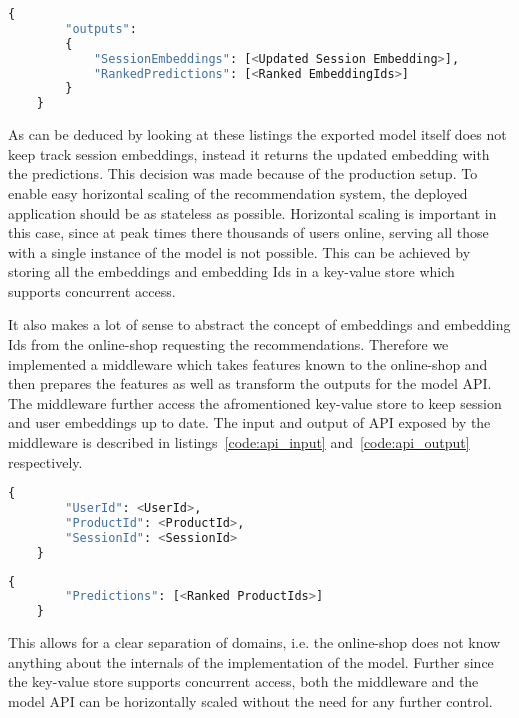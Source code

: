 \begin{minipage}{\linewidth}
    \begin{lstlisting}[language=Python,frame=single,caption=TF Serve API Output,label=code:tf_serve_output]
    {
        "outputs": 
        {
            "SessionEmbeddings": [<Updated Session Embedding>],
            "RankedPredictions": [<Ranked EmbeddingIds>]
        }
    }
    \end{lstlisting}
\end{minipage}

As can be deduced by looking at these listings the exported model itself does not keep track session embeddings, instead it returns the updated embedding with the predictions.
This decision was made because of the production setup.
To enable easy horizontal scaling of the recommendation system, the deployed application should be as stateless as possible.
Horizontal scaling is important in this case, since at peak times there thousands of users online, serving all those with a single instance of the model is not possible.
This can be achieved by storing all the embeddings and embedding Ids in a key-value store which supports concurrent access.
\par
It also makes a lot of sense to abstract the concept of embeddings and embedding Ids from the online-shop requesting the recommendations.
Therefore we implemented a middleware which takes features known to the online-shop and then prepares the features as well as transform the outputs for the model API.
The middleware further access the afromentioned key-value store to keep session and user embeddings up to date.
The input and output of API exposed by the middleware is described in listings~\ref{code:api_input} and~\ref{code:api_output} respectively.

\begin{minipage}{\linewidth}
    \begin{lstlisting}[language=Python,frame=single,caption=Middleware API Input,label=code:api_input]
    {
        "UserId": <UserId>,
        "ProductId": <ProductId>,
        "SessionId": <SessionId>
    }
    \end{lstlisting}
\end{minipage}

\begin{minipage}{\linewidth}
    \begin{lstlisting}[language=Python,frame=single,caption=Middleware API Output,label=code:api_output]
    {
        "Predictions": [<Ranked ProductIds>]
    }
    \end{lstlisting}
\end{minipage}
This allows for a clear separation of domains, i.e. the online-shop does not know anything about the internals of the implementation of the model.
Further since the key-value store supports concurrent access, both the middleware and the model API can be horizontally scaled without the need for any further control.
